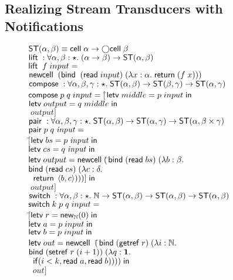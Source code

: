 \subsection{Realizing Stream Transducers with Notifications}

\begin{figure}
\mbox{}
\begin{tabbing}
$\mathsf{ST}({\alpha}, {\beta}) \equiv \mathsf{cell}\;{\alpha} \to \bigcirc{\mathsf{cell}\;{\beta}}$ \\[1em]

$\mathsf{lift}\; : \forall \alpha,\beta:\star.\; (\alpha \to \beta) \to \mathsf{ST}({\alpha}, {\beta})$ \\
$\mathsf{lift}\;\;f\;input = $ \\
\;\; $\mathsf{newcell}\;\; (\mathsf{bind}\;\;(\mathsf{read}\; input)\; (\lambda x:\alpha.\;\mathsf{return}\; (f\;x)))$ \\[1em]

$\mathsf{compose}\; : \forall \alpha,\beta,\gamma:\star.\; \mathsf{ST}({\alpha}, {\beta}) \to \mathsf{ST}({\beta}, {\gamma}) \to \mathsf{ST}({\alpha}, {\gamma})$ \\
$\mathsf{compose}\; p\;q\;input = [$\=$\letv{middle}{p\;input}$ \\
                            \>$\letv{output}{q\;middle}$ \\ 
                            \>$\;output]$ \\[1em]

$\mathsf{pair}\; : \forall \alpha,\beta,\gamma:\star.\; \mathsf{ST}({\alpha}, {\beta}) \to \mathsf{ST}({\alpha}, {\gamma}) \to \mathsf{ST}({\alpha}, {\beta \times \gamma})$ \\
$\mathsf{pair}\; p \; q \; \mathit{input} = $ \\
\;\;$[$\=$\mathsf{letv}\;bs = p\;\mathit{input}\;\mathsf{in}\;$ \\
     \>$\mathsf{letv}\;cs = q\;\mathit{input}\;\mathsf{in}\; $ \\
     \>$\mathsf{letv}\;output = \mathsf{newcell}\; ($\=$\mathsf{bind}\; (\mathsf{read}\; bs)\; (\lambda b:\beta.$ \\
     \>                                   \>$\mathsf{bind}\; (\mathsf{read}\; cs)\; (\lambda c:\delta.$ \\
     \>                                   \>$\;\;\mathsf{return}\; \left<{b},{c}\right>)))] \;\mathsf{in}$ \\
     \>$\;output]$ \\[1em]

$\mathsf{switch}\; : \forall \alpha,\beta:\star.\; \mathbb{N} \to \mathsf{ST}({\alpha}, {\beta}) \to \mathsf{ST}({\alpha}, {\beta}) \to \mathsf{ST}({\alpha}, {\beta})$ \\
$\mathsf{switch}\; k\;p\;q\; input =  $ \\
\;\;$[$\=$\mathsf{letv}\;r = \mathsf{new}_{\mathbb{N}}(0)\;\mathsf{in}\;$ \\
    \>$\letv{a}{p\;input}$ \\
    \>$\letv{b}{p\;input}$ \\
    \>$\mathsf{letv}\; out = \mathsf{newcell}\;\; ($\=$\mathsf{bind}\; (\mathsf{getref}\; r) \;(\lambda i:\mathbb{N}.\;$ \\
    \>                                 \>$\mathsf{bind}\; (\mathsf{setref}\; r\;(i+1)) \; (\lambda q:\mathbf{1}.$ \\
    \>                                 \>$\;\;\mathsf{if}(i < k, \mathsf{read}\; a, \mathsf{read}\; b)))) \;\mathsf{in}$ \\
    \>$\;\;out]$\\[1em]


\end{tabbing}
\end{figure}
